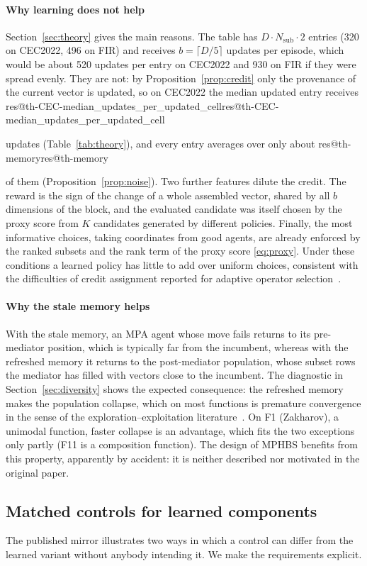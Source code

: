 \documentclass[11pt]{article}
\makeatletter
\theoremstyle{definition}
\theoremstyle{remark}
\renewcommand\res[1]{\ifcsname res@#1\endcsname\csname res@#1\endcsname\else\PackageError{res}{Undefined result key #1}{}\fi}
\makeatother
\begin{document}
\paragraph{Why learning does not help}
Section~\ref{sec:theory} gives the main reasons. The table has $D\cdot N_\mathrm{sub}\cdot 2$ entries (320 on
CEC2022, 496 on FIR) and receives $b=\lceil D/5\rceil$ updates per episode, which would be about 520 updates per entry
on CEC2022 and 930 on FIR if they were spread evenly. They are not: by Proposition~\ref{prop:credit} only the
provenance of the current vector is updated, so on CEC2022 the median updated entry receives
\res{th-CEC-median_updates_per_updated_cell} updates (Table~\ref{tab:theory}), and every entry averages over only about
\res{th-memory} of them (Proposition~\ref{prop:noise}). Two further features dilute the credit. The reward is the sign of
the change of a whole assembled vector, shared by all $b$ dimensions of the block, and the evaluated candidate was itself
chosen by the proxy score from $K$ candidates generated by different policies. Finally, the most informative choices,
taking coordinates from good agents, are already enforced by the ranked subsets and the rank term of the proxy score
\eqref{eq:proxy}. Under these conditions a learned policy has little to add over uniform choices, consistent with the
difficulties of credit assignment reported for adaptive operator selection~\citep{fialho2010bandit}.

\paragraph{Why the stale memory helps}
With the stale memory, an MPA agent whose move fails returns to its pre-mediator position, which is typically far from
the incumbent, whereas with the refreshed memory it returns to the post-mediator population, whose subset rows the
mediator has filled with vectors close to the incumbent. The diagnostic in Section~\ref{sec:diversity} shows the expected
consequence: the refreshed memory makes the population collapse, which on most functions is premature convergence in the
sense of the exploration--exploitation literature~\citep{crepinsek2013exploration}. On F1 (Zakharov), a unimodal function,
faster collapse is an advantage, which fits the two exceptions only partly (F11 is a composition function). The design of
MPHBS benefits from this property, apparently by accident: it is neither described nor motivated in the original paper.

\subsection{Matched controls for learned components}
The published mirror illustrates two ways in which a control can differ from the learned variant without anybody
intending it. We make the requirements explicit.
\end{document}
